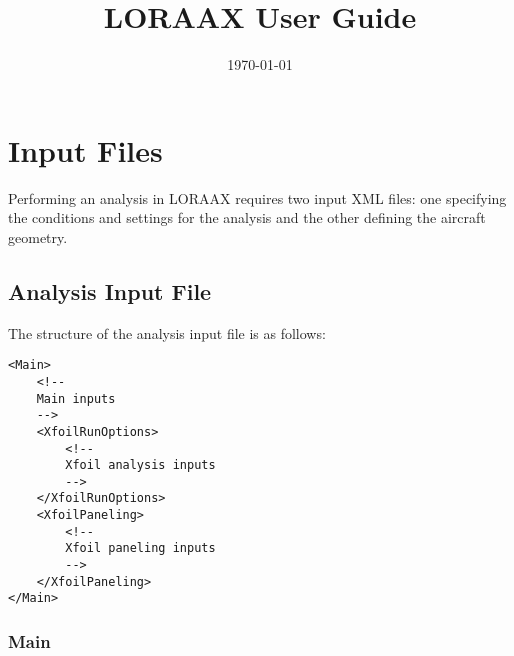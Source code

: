 \documentclass[11pt]{article}
\begin{document}
\title{LORAAX User Guide}
\date{\today}
\maketitle

\tableofcontents

\section{Input Files}

Performing an analysis in LORAAX requires two input XML files: one specifying
the conditions and settings for the analysis and the other defining the
aircraft geometry.

\subsection{Analysis Input File}

The structure of the analysis input file is as follows:
\begin{verbatim}
<Main>
    <!--
    Main inputs 
    -->
    <XfoilRunOptions>
        <!--
        Xfoil analysis inputs
        -->
    </XfoilRunOptions>
    <XfoilPaneling>
        <!--
        Xfoil paneling inputs
        -->
    </XfoilPaneling>
</Main>
\end{verbatim}

\subsubsection{Main}
\end{document}

